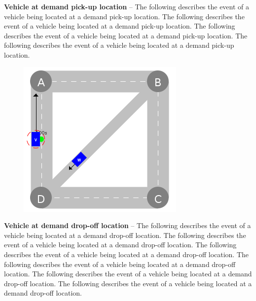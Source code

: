 \documentclass[graybox]{svmult}
\begin{document}
\noindent
\textbf{Vehicle at demand pick-up location}
--
The following describes the event of a vehicle being located at a demand pick-up location.
The following describes the event of a vehicle being located at a demand pick-up location.
The following describes the event of a vehicle being located at a demand pick-up location.
The following describes the event of a vehicle being located at a demand pick-up location.

\vspace{4mm}

\begin{figure}
	\centering
	\includegraphics[scale=0.35]{../../events/vehicle-at-demand-drop-off.png}
\end{figure}

\noindent
\textbf{Vehicle at demand drop-off location}
--
The following describes the event of a vehicle being located at a demand drop-off location.
The following describes the event of a vehicle being located at a demand drop-off location.
The following describes the event of a vehicle being located at a demand drop-off location.
The following describes the event of a vehicle being located at a demand drop-off location.
The following describes the event of a vehicle being located at a demand drop-off location.
The following describes the event of a vehicle being located at a demand drop-off location.

\vspace{4mm}
\end{document}
